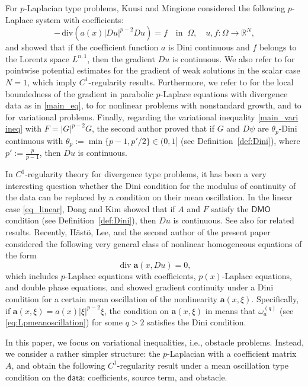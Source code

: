 \documentclass[reqno]{amsart}
\numberwithin{equation}{section}
\theoremstyle{plain}
\theoremstyle{definition}
\theoremstyle{remark}
\DeclareMathOperator{\dv}{div}
\begin{document}
For $p$-Laplacian type problems, Kuusi and Mingione \cite{KM14} considered the following $p$-Laplace system with coefficients:
$$
-\,\mathrm{div} \left(a(x)|Du|^{p-2}Du\right) = f
\quad \text{in }\ \Omega, 
\quad u, f:\Omega \to \mathbb{R}^N,
$$
and showed that if the coefficient function $a$ is Dini continuous and $f$ belongs to the Lorentz space $L^{n,1}$, then the gradient $Du$ is continuous. We also refer to \cite{DM10,KM13,Mingione11} for pointwise potential estimates for the gradient of weak solutions in the scalar case $N=1$, which imply $C^1$-regularity results. Furthermore, we refer to \cite{KM12} for the local boundedness of the gradient in parabolic $p$-Laplace equations with divergence data as in \eqref{main_eq}, to \cite{Baroni23,Baroni25,Ok15} for nonlinear problems with nonstandard growth, and to \cite{BMK14,Ok17-1} for variational problems. Finally, regarding the variational inequality \eqref{main_vari ineq} with $F=|G|^{p-2}G$, the second author \cite{Ok17} proved that if $G$ and $D\psi$ are $\theta_p$-Dini continuous with $\theta_p:= \min\{p-1,p'/2\}\in (0,1]$ (see Definition~\ref{def:Dini}), where $p':=\frac{p}{p-1}$, then $Du$ is continuous.

In $C^1$-regularity theory for divergence type problems, it has been a very interesting question whether the Dini condition for the modulus of continuity of the data can be replaced by a condition on their mean oscillation. In the linear case \eqref{eq_linear}, Dong and Kim \cite{DK17} showed that if $A$ and $F$ satisfy the $\mathsf{DMO}$ condition (see Definition~\ref{def:Dini}), then $Du$ is continuous. See also \cite{DEK18, YanyanLi17, DEK21, JMV09,  DK21} for related results. Recently, H\"ast\"o, Lee, and the second author of the present paper \cite{HLO25} considered the following very general class of nonlinear homogeneous equations of the form
\[
\dv \mathbf{a}(x,Du) =0,
\]
which includes $p$-Laplace equations with coefficients, $p(x)$-Laplace equations, and double phase equations, and showed gradient continuity under a Dini condition for a certain mean oscillation of the nonlinearity $\mathbf{a}(x,\xi)$. Specifically, if $\mathbf{a}(x,\xi)=a(x)|\xi|^{p-2}\xi$, the condition on $\mathbf{a}(x,\xi)$ in \cite{HLO25} means that $\omega^{(q)}_a$ (see \eqref{eq:Lpmeanoscillation})  for some $q>2$ satisfies the Dini condition.

In this paper, we focus on variational inequalities, i.e., obstacle problems. Instead, we consider a rather simpler structure: the $p$-Laplacian with a coefficient matrix $A$, and obtain the following $C^1$-regularity result under a mean oscillation type condition on the $\mathsf{data}$: coefficients, source term, and obstacle. 
\end{document}
